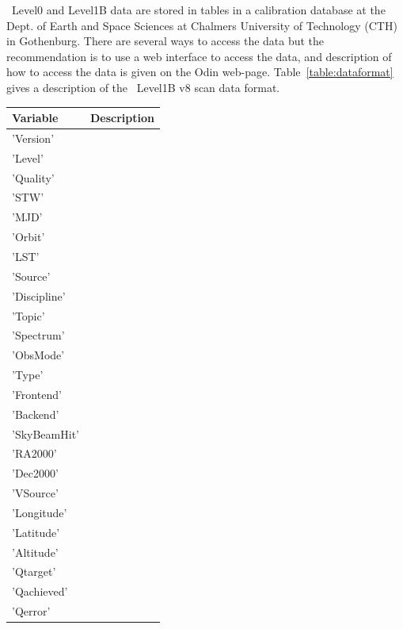 \smr\ Level0 and Level1B data are stored in tables
in a calibration database at the Dept. of Earth and Space
Sciences at Chalmers University of Technology (CTH) in Gothenburg.
There are several ways to access the data but the recommendation is to use a web 
interface to access the data, and description of how to access the data
is given on the Odin web-page. Table~\ref{table:dataformat} gives a description 
of the \smr\ Level1B v8 scan data format.

\begin{longtable}{| p{} | p{} |} 
\hline
  \textbf{Variable} & \textbf{Description} \\
  \hline
  'Version'         & \\ \hline
  'Level'           & \\ \hline
     'Quality'         & \\ \hline
     'STW'             & \\ \hline
     'MJD'             & \\ \hline
     'Orbit'           & \\ \hline
     'LST'             & \\ \hline
     'Source'          & \\ \hline
     'Discipline'      & \\ \hline
     'Topic'          & \\ \hline
     'Spectrum'        & \\    \hline
     'ObsMode'        & \\ \hline
     'Type'            & \\ \hline
     'Frontend'       & \\ \hline
     'Backend'       & \\ \hline
     'SkyBeamHit'      & \\ \hline
     'RA2000'        & \\ \hline
     'Dec2000'        & \\ \hline
     'VSource'         & \\ \hline
     'Longitude'    & \\ \hline
     'Latitude'        & \\ \hline
     'Altitude'        & \\ \hline
     'Qtarget'       & \\ \hline
     'Qachieved'      & \\ \hline
     'Qerror'         & \\ \hline

\end{longtable}
